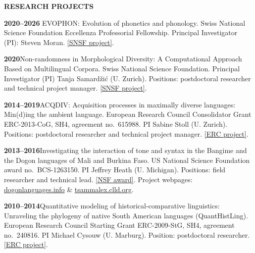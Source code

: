 \documentclass[11pt]{article}
\newcommand{\hangpara}{
 \setlength{\parindent}{0in} %
 \hangindent=0.42in %
}
\begin{document}
\vskip 20pt
\begin{flushleft}
{\bf RESEARCH PROJECTS}
\end{flushleft}


\hangpara
{\bf 2020--2026} EVOPHON: Evolution of phonetics and phonology. Swiss National Science Foundation Eccellenza Professorial Fellowship. Principal Investigator (PI): Steven Moran. \href{https://data.snf.ch/grants/grant/186841}{[SNSF project]}.

\vskip 6pt
\hangpara
{\bf 2020}\hspace{1ex}Non-randomness in Morphological Diversity: A Computational Approach Based on Multilingual Corpora. Swiss National Science Foundation. Principal Investigator (PI) Tanja Samardžić (U. Zurich). Positions: postdoctoral researcher and technical project manager. \href{https://data.snf.ch/grants/grant/176305}{[SNSF project]}. %

\vskip 6pt
\hangpara
{\bf 2014--2019}\hspace{1ex}ACQDIV: Acquisition processes in maximally diverse languages: Min(d)ing the ambient language. European Research Council Consolidator Grant ERC-2013-CoG, SH4, agreement no.\ 615988. PI Sabine Stoll (U. Zurich). Positions: postdoctoral researcher and technical project manager. \href{https://cordis.europa.eu/project/id/615988}{[ERC project]}. 

\vskip 6pt
\hangpara
{\bf 2013--2016}\hspace{1ex}Investigating the interaction of tone and syntax in the Bangime and the Dogon languages of Mali and Burkina Faso. US National Science Foundation award no.\ BCS-1263150. PI Jeffrey Heath (U. Michigan). Positions: field researcher and technical lead. \href{https://www.nsf.gov/awardsearch/showAward?AWD_ID=1263150}{[NSF award]}. Project webpages: \href{https://dogonlanguages.info}{dogonlanguages.info} \& \href{https://tsammalex.clld.org/}{tsammalex.clld.org}.

\vskip 6pt
\hangpara
{\bf 2010--2014}\hspace{1ex}Quantitative modeling of historical-comparative linguistics: Unraveling the phylogeny of native South American languages (QuantHistLing). European Research Council Starting Grant ERC-2009-StG, SH4, agreement no.\ 240816. PI Michael Cysouw (U. Marburg). Position: postdoctoral researcher. \href{https://cordis.europa.eu/project/id/240816}{[ERC project]}.
\end{document}
